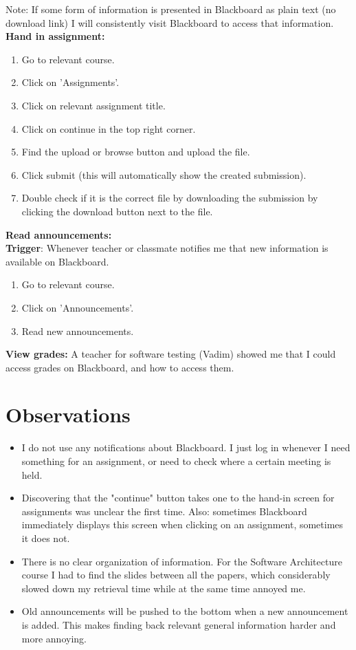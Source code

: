 Note: If some form of information is presented in Blackboard as plain text (no download link) I will consistently visit Blackboard to access that information.\\

\textbf{Hand in assignment:}
\begin{enumerate}
	\item Go to relevant course.
	\item Click on 'Assignments'.
	\item Click on relevant assignment title.
	\item Click on continue in the top right corner.
	\item Find the upload or browse button and upload the file.
	\item Click submit (this will automatically show the created submission).
	\item Double check if it is the correct file by downloading the submission by clicking the download button next to the file.
\end{enumerate}

\pagebreak[4]

\textbf{Read announcements:}\\
\textbf{Trigger}: Whenever teacher or classmate notifies me that new information is available on Blackboard.
\begin{enumerate}
	\item Go to relevant course.
	\item Click on 'Announcements'.
	\item Read new announcements.
\end{enumerate}

\textbf{View grades:}
A teacher for software testing (Vadim) showed me that I could access grades on Blackboard, and how to access them.


\section{Observations}

\begin{itemize}
	\item I do not use any notifications about Blackboard. I just log in whenever I need something for an assignment, or need to check where a certain meeting is held.
	\item Discovering that the "continue" button takes one to the hand-in screen for assignments was unclear the first time. Also: sometimes Blackboard immediately displays this screen when clicking on an assignment, sometimes it does not.
	\item There is no clear organization of information. For the Software Architecture course I had to find the slides between all the papers, which considerably slowed down my retrieval time while at the same time annoyed me.
	\item Old announcements will be pushed to the bottom when a new announcement is added. This makes finding back relevant general information harder and more annoying. 
\end{itemize}



